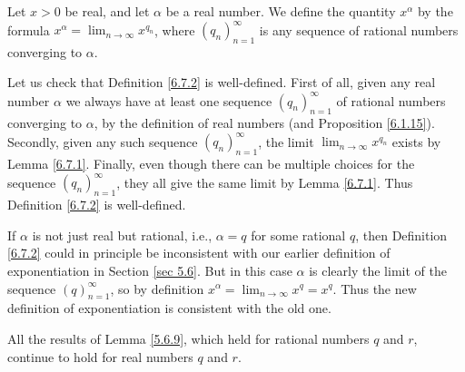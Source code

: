 \begin{definition}\label{6.7.2}
    Let \(x > 0\) be real, and let \(\alpha\) be a real number.
    We define the quantity \(x^\alpha\) by the formula \(x^\alpha = \lim_{n \to \infty} x^{q_n}\), where \((q_n)_{n = 1}^\infty\) is any sequence of rational numbers converging to \(\alpha\).
\end{definition}

\begin{note}
    Let us check that Definition \ref{6.7.2} is well-defined.
    First of all, given any real number \(\alpha\) we always have at least one sequence \((q_n)_{n = 1}^\infty\) of rational numbers converging to \(\alpha\), by the definition of real numbers (and Proposition \ref{6.1.15}).
    Secondly, given any such sequence \((q_n)_{n = 1}^\infty\), the limit \(\lim_{n \to \infty} x^{q_n}\) exists by Lemma \ref{6.7.1}.
    Finally, even though there can be multiple choices for the sequence \((q_n)_{n = 1}^\infty\), they all give the same limit by Lemma \ref{6.7.1}.
    Thus Definition \ref{6.7.2} is well-defined.
\end{note}

\begin{note}
    If \(\alpha\) is not just real but rational, i.e., \(\alpha = q\) for some rational \(q\), then Definition \ref{6.7.2} could in principle be inconsistent with our earlier definition of exponentiation in Section \ref{sec 5.6}.
    But in this case \(\alpha\) is clearly the limit of the sequence \((q)_{n = 1}^\infty\), so by definition \(x^\alpha = \lim_{n \to \infty} x^q = x^q\).
    Thus the new definition of exponentiation is consistent with the old one.
\end{note}

\begin{proposition}\label{6.7.3}
    All the results of Lemma \ref{5.6.9}, which held for rational numbers \(q\) and \(r\), continue to hold for real numbers \(q\) and \(r\).
\end{proposition}

